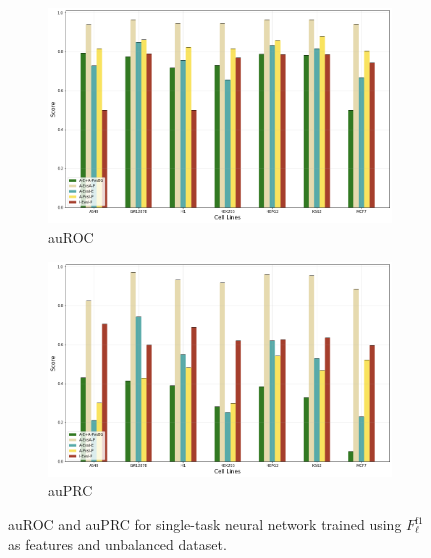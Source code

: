 \begin{figure}[!htbp]
    \centering
    \begin{subfigure}[b]{\textwidth}
        \includegraphics[width=\textwidth]{images/results_plots/single_tasks/unbalanced_new_auroc.png}
        \caption{auROC}
        \label{fig:auroc_unbalanced_new}
    \end{subfigure}
    \begin{subfigure}[b]{\textwidth}
        \includegraphics[width=\textwidth]{images/results_plots/single_tasks/unbalanced_new_auprc.png}
        \caption{auPRC}
        \label{fig:auprc_unbalanced_new}
    \end{subfigure}
    \caption{auROC and auPRC for single-task neural network trained using $F_\ell^{\textrm{f1}}$ as features and unbalanced dataset.}\label{fig:unbalanced_new_results}
\end{figure}

